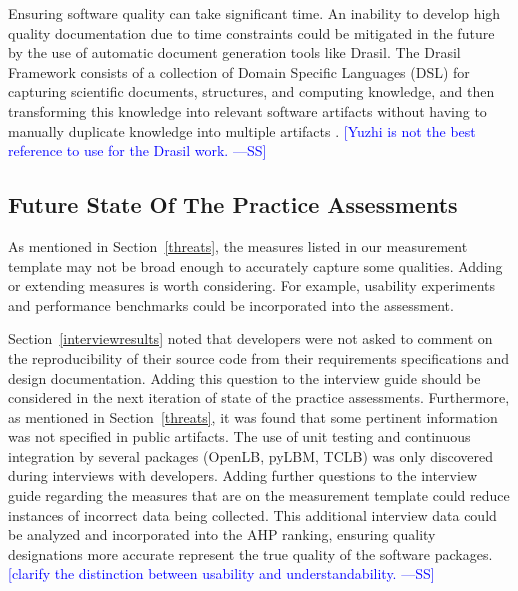 \documentclass[final, 3p, times, authoryear]{elsarticle}
\newcommand{\authornote}[3]{\textcolor{#1}{[#3 ---#2]}}
\newcommand{\authornote}[3]{}
\newcommand{\wss}[1]{\authornote{blue}{SS}{#1}} %
\begin{document}
Ensuring software quality can take significant time. An inability to develop
high quality documentation due to time constraints could be mitigated in the
future by the use of automatic document generation tools like Drasil. The Drasil
Framework consists of a collection of Domain Specific Languages (DSL) for
capturing scientific documents, structures, and computing knowledge, and then
transforming this knowledge into relevant software artifacts without having to
manually duplicate knowledge into multiple artifacts \citep{zhao2018}.
\wss{Yuzhi is not the best reference to use for the Drasil work.}

\subsection{Future State Of The Practice Assessments} \label{futuresop}

As mentioned in Section~\ref{threats}, the measures listed in our measurement
template may not be broad enough to accurately capture some qualities. Adding or
extending measures is worth considering. For example, usability experiments and
performance benchmarks could be incorporated into the assessment.

Section~\ref{interviewresults} noted that developers were not asked to comment
on the reproducibility of their source code from their requirements
specifications and design documentation. Adding this question to the interview
guide should be considered in the next iteration of state of the practice
assessments. Furthermore, as mentioned in Section~\ref{threats}, it was found
that some pertinent information was not specified in public artifacts. The use
of unit testing and continuous integration by several packages (OpenLB, pyLBM,
TCLB) was only discovered during interviews with developers. Adding further
questions to the interview guide regarding the measures that are on the
measurement template could reduce instances of incorrect data being collected.
This additional interview data could be analyzed and incorporated into the AHP
ranking, ensuring quality designations more accurate represent the true quality
of the software packages.  \wss{clarify the distinction between usability and
understandability.}



\end{document}
